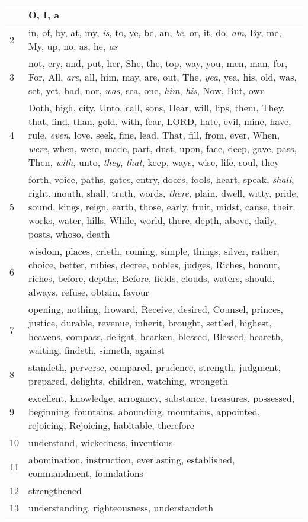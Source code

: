 \begin{center}
\begin{longtable}{l|p{3.75in}}
\hline \hline 
\endlastfoot 
1 & O, I, a\\ \hline 
2 & in, of, by, at, my, \emph{is}, to, ye, be, an, \emph{be}, or, it, do, \emph{am}, By, me, My, up, no, as, he, \emph{as}\\ \hline 
3 & not, cry, and, put, her, She, the, top, way, you, men, man, for, For, All, \emph{are}, all, him, may, are, out, The, \emph{yea}, yea, his, old, was, set, yet, had, nor, \emph{was}, sea, one, \emph{him}, \emph{his}, Now, But, own\\ \hline 
4 & Doth, high, city, Unto, call, sons, Hear, will, lips, them, They, that, find, than, gold, with, fear, LORD, hate, evil, mine, have, rule, \emph{even}, love, seek, fine, lead, That, fill, from, ever, When, \emph{were}, when, were, made, part, dust, upon, face, deep, gave, pass, Then, \emph{with}, unto, \emph{they}, \emph{that}, keep, ways, wise, life, soul, they\\ \hline 
5 & forth, voice, paths, gates, entry, doors, fools, heart, speak, \emph{shall}, right, mouth, shall, truth, words, \emph{there}, plain, dwell, witty, pride, sound, kings, reign, earth, those, early, fruit, midst, cause, their, works, water, hills, While, world, there, depth, above, daily, posts, whoso, death\\ \hline 
6 & wisdom, places, crieth, coming, simple, things, silver, rather, choice, better, rubies, decree, nobles, judges, Riches, honour, riches, before, depths, Before, fields, clouds, waters, should, always, refuse, obtain, favour\\ \hline 
7 & opening, nothing, froward, Receive, desired, Counsel, princes, justice, durable, revenue, inherit, brought, settled, highest, heavens, compass, delight, hearken, blessed, Blessed, heareth, waiting, findeth, sinneth, against\\ \hline 
8 & standeth, perverse, compared, prudence, strength, judgment, prepared, delights, children, watching, wrongeth\\ \hline 
9 & excellent, knowledge, arrogancy, substance, treasures, possessed, beginning, fountains, abounding, mountains, appointed, rejoicing, Rejoicing, habitable, therefore\\ \hline 
10 & understand, wickedness, inventions\\ \hline 
11 & abomination, instruction, everlasting, established, commandment, foundations\\ \hline 
12 & strengthened\\ \hline 
13 & understanding, righteousness, understandeth\\ \hline 
\end{longtable} 
\end{center} 




 
